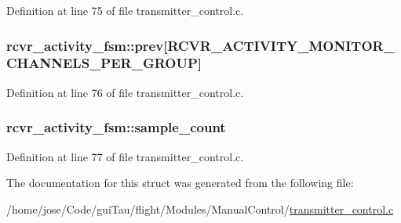 Definition at line 75 of file transmitter\-\_\-control.\-c.

\hypertarget{structrcvr__activity__fsm_acbfbcf2f18825d85bc9c672190f3d357}{
\subsubsection[{prev}]{ rcvr\-\_\-activity\-\_\-fsm\-::prev\mbox{[}R\-C\-V\-R\-\_\-\-A\-C\-T\-I\-V\-I\-T\-Y\-\_\-\-M\-O\-N\-I\-T\-O\-R\-\_\-\-C\-H\-A\-N\-N\-E\-L\-S\-\_\-\-P\-E\-R\-\_\-\-G\-R\-O\-U\-P\mbox{]}}}\label{structrcvr__activity__fsm_acbfbcf2f18825d85bc9c672190f3d357}


Definition at line 76 of file transmitter\-\_\-control.\-c.

\hypertarget{structrcvr__activity__fsm_a68c72760513df75e420f5ed8c2046e9c}{
\subsubsection[{sample\-\_\-count}]{ rcvr\-\_\-activity\-\_\-fsm\-::sample\-\_\-count}}\label{structrcvr__activity__fsm_a68c72760513df75e420f5ed8c2046e9c}


Definition at line 77 of file transmitter\-\_\-control.\-c.



The documentation for this struct was generated from the following file\-:\begin{DoxyCompactItemize}
\item 
/home/jose/\-Code/gui\-Tau/flight/\-Modules/\-Manual\-Control/\hyperlink{transmitter__control_8c}{transmitter\-\_\-control.\-c}\end{DoxyCompactItemize}
